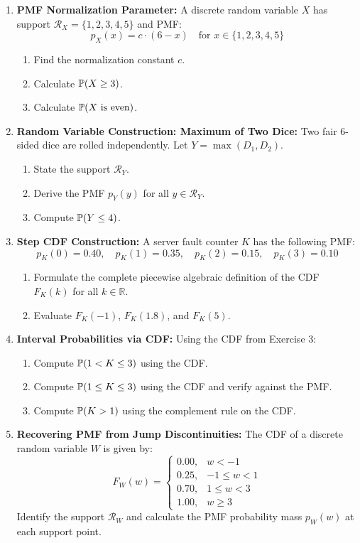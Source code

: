 \begin{enumerate}
    \item \textbf{PMF Normalization Parameter:} A discrete random variable $X$ has support $\mathcal{R}_X = \{1, 2, 3, 4, 5\}$ and PMF:
    $$p_X(x) = c \cdot (6 - x) \quad \text{for } x \in \{1, 2, 3, 4, 5\}$$
    \begin{enumerate}
        \item Find the normalization constant $c$.
        \item Calculate $\P(X \ge 3)$.
        \item Calculate $\P(X \text{ is even})$.
    \end{enumerate}

    \item \textbf{Random Variable Construction: Maximum of Two Dice:} Two fair 6-sided dice are rolled independently. Let $Y = \max(D_1, D_2)$.
    \begin{enumerate}
        \item State the support $\mathcal{R}_Y$.
        \item Derive the PMF $p_Y(y)$ for all $y \in \mathcal{R}_Y$.
        \item Compute $\P(Y \le 4)$.
    \end{enumerate}

    \item \textbf{Step CDF Construction:} A server fault counter $K$ has the following PMF:
    $$p_K(0) = 0.40, \quad p_K(1) = 0.35, \quad p_K(2) = 0.15, \quad p_K(3) = 0.10$$
    \begin{enumerate}
        \item Formulate the complete piecewise algebraic definition of the CDF $F_K(k)$ for all $k \in \mathbb{R}$.
        \item Evaluate $F_K(-1)$, $F_K(1.8)$, and $F_K(5)$.
    \end{enumerate}

    \item \textbf{Interval Probabilities via CDF:} Using the CDF from Exercise 3:
    \begin{enumerate}
        \item Compute $\P(1 < K \le 3)$ using the CDF.
        \item Compute $\P(1 \le K \le 3)$ using the CDF and verify against the PMF.
        \item Compute $\P(K > 1)$ using the complement rule on the CDF.
    \end{enumerate}

    \item \textbf{Recovering PMF from Jump Discontinuities:} The CDF of a discrete random variable $W$ is given by:
    $$F_W(w) = \begin{cases}
    0.00, & w < -1 \\
    0.25, & -1 \le w < 1 \\
    0.70, & 1 \le w < 3 \\
    1.00, & w \ge 3
    \end{cases}$$
    Identify the support $\mathcal{R}_W$ and calculate the PMF probability mass $p_W(w)$ at each support point.
\end{enumerate}


